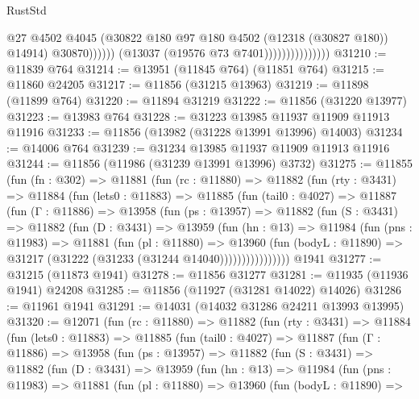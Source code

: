 \begin{lexlean}{RustStd}
\begin{coremodule}
                                          @27
                                          @4502
                                          @4045
                                          (@30822 @180 @97 @180 @4502 (@12318 (@30827 @180)) @14914)
                                          @30870))))))
                              (@13037 (@19576 @73 @7401)))))))))))))))
@31210 := @11839 @764
@31214 := @13951 (@11845 @764) (@11851 @764)
@31215 := @11860 @24205
@31217 := @11856 (@31215 @13963)
@31219 := @11898 (@11899 @764)
@31220 := @11894 @31219
@31222 := @11856 (@31220 @13977)
@31223 := @13983 @764
@31228 := @31223 @13985 @11937 @11909 @11913 @11916
@31233 := @11856 (@13982 (@31228 @13991 @13996) @14003)
@31234 := @14006 @764
@31239 := @31234 @13985 @11937 @11909 @11913 @11916
@31244 := @11856 (@11986 (@31239 @13991 @13996) @3732)
@31275 := @11855
    (fun (fn : @302) =>
    @11881
      (fun (rc : @11880) =>
      @11882
        (fun (rty : @3431) =>
        @11884
          (fun (lets0 : @11883) =>
          @11885
            (fun (tail0 : @4027) =>
            @11887
              (fun (Γ : @11886) =>
              @13958
                (fun (ps : @13957) =>
                @11882
                  (fun (S : @3431) =>
                  @11882
                    (fun (D : @3431) =>
                    @13959
                      (fun (hn : @13) =>
                      @11984
                        (fun (pns : @11983) =>
                        @11881
                          (fun (pl : @11880) =>
                          @13960
                            (fun (bodyL : @11890) =>
                            @31217 (@31222 (@31233 (@31244 @14040))))))))))))))))
    @1941
@31277 := @31215 (@11873 @1941)
@31278 := @11856 @31277
@31281 := @11935 (@11936 @1941) @24208
@31285 := @11856 (@11927 (@31281 @14022) @14026)
@31286 := @11961 @1941
@31291 := @14031 (@14032 @31286 @24211 @13993 @13995)
@31320 := @12071
    (fun (rc : @11880) =>
    @11882
      (fun (rty : @3431) =>
      @11884
        (fun (lets0 : @11883) =>
        @11885
          (fun (tail0 : @4027) =>
          @11887
            (fun (Γ : @11886) =>
            @13958
              (fun (ps : @13957) =>
              @11882
                (fun (S : @3431) =>
                @11882
                  (fun (D : @3431) =>
                  @13959
                    (fun (hn : @13) =>
                    @11984
                      (fun (pns : @11983) =>
                      @11881
                        (fun (pl : @11880) =>
                        @13960
                          (fun (bodyL : @11890) =>

\end{coremodule}
\end{lexlean}
